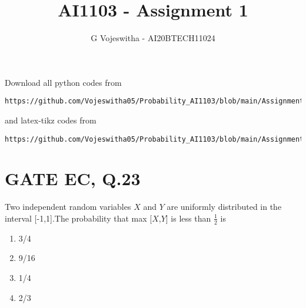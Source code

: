 \documentclass[journal,12pt,twocolumn]{IEEEtran}
\begin{document}
     \def\centbox#1{\makebox[0in]{#1}}
     \def\topbox#1{\raisebox{-\baselineskip}[0in][0in]{#1}}
     \def\midbox#1{\raisebox{-0.5\baselineskip}[0in][0in]{#1}}
\vspace{3cm}
\title{AI1103 - Assignment 1}
\author{G Vojeswitha - AI20BTECH11024}
\maketitle
\newpage
\bigskip
\renewcommand{\thefigure}{\theenumi}
\renewcommand{\thetable}{\theenumi}
Download all python codes from 
\begin{lstlisting}
https://github.com/Vojeswitha05/Probability_AI1103/blob/main/Assignment_4/simulation_4.py
\end{lstlisting}
%
and latex-tikz codes from 
%
\begin{lstlisting}
https://github.com/Vojeswitha05/Probability_AI1103/blob/main/Assignment_4/latex_4.tex
\end{lstlisting}
\section{GATE EC, Q.23}
Two independent random variables \(X\) and \(Y\)
are uniformly distributed in the interval [-1,1].The probability that max [\(X\),\(Y\)] is less than \(\frac{1}{2}\) is
\begin{enumerate}[label={\Alph*)}]
    \item 3/4
    \item 9/16
    \item 1/4
    \item 2/3
\end{enumerate}
\end{document}

